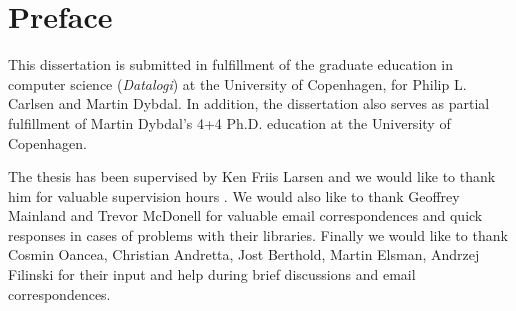 \chapter{Preface}
This dissertation is submitted in fulfillment of the graduate education
in computer science (\textit{Datalogi}) at the University of
Copenhagen, for Philip L. Carlsen and Martin Dybdal. In addition, the
dissertation also serves as partial fulfillment of Martin Dybdal's 4+4
Ph.D. education at the University of Copenhagen.

The thesis has been supervised by Ken Friis Larsen and we would like
to thank him for valuable supervision hours . We would
also like to thank Geoffrey Mainland and Trevor McDonell for valuable
email correspondences and quick responses in cases of problems with
their libraries. Finally we would like to thank Cosmin Oancea,
Christian Andretta, Jost Berthold, Martin Elsman, Andrzej Filinski for
their input and help during brief discussions and email
correspondences.

